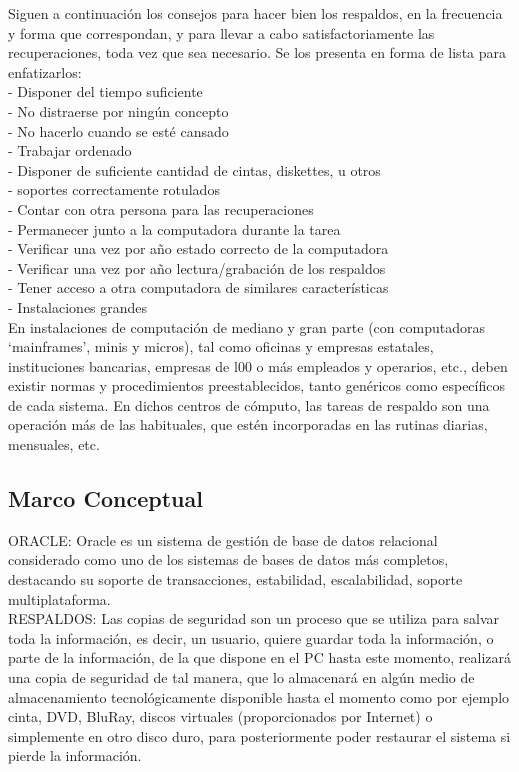 \documentclass[12pt,letterpaper]{article}
\begin{document}
Siguen a continuación los consejos para hacer bien los respaldos, en la frecuencia y forma que correspondan, y para llevar a cabo satisfactoriamente las recuperaciones, toda vez que sea necesario. Se los presenta en forma de lista para enfatizarlos: \\
-	Disponer del tiempo suficiente\\
-	No distraerse por ningún concepto\\
-	No hacerlo cuando se esté cansado\\
-	Trabajar ordenado\\
-	Disponer de suficiente cantidad de cintas, diskettes, u otros \\
-	soportes correctamente rotulados\\
-	Contar con otra persona para las recuperaciones\\
-	Permanecer junto a la computadora durante la  tarea\\
-	Verificar una vez por año estado correcto de la computadora\\
-	Verificar una vez por año lectura/grabación de los respaldos\\
-	Tener acceso a otra computadora de similares características  \\

- 	Instalaciones grandes\\
 En instalaciones de computación de mediano y gran parte (con computadoras ‘mainframes’, minis y micros), tal como oficinas y empresas estatales, instituciones bancarias, empresas de l00 o más empleados y operarios, etc., deben existir normas y procedimientos preestablecidos, tanto genéricos como específicos de cada sistema. En dichos centros de cómputo, las tareas de respaldo son una operación más de las habituales, que estén incorporadas en las rutinas diarias, mensuales, etc.\\




\subsection{Marco Conceptual}

 ORACLE: Oracle es un sistema de gestión de base de datos relacional considerado como uno de los sistemas de bases de datos más completos, destacando su soporte de transacciones, estabilidad, escalabilidad, soporte multiplataforma. \\

 RESPALDOS: Las copias de seguridad son un proceso que se utiliza para salvar toda la información, es decir, un usuario, quiere guardar toda la información, o parte de la información, de la que dispone en el PC hasta este momento, realizará una copia de seguridad de tal manera, que lo almacenará en algún medio de almacenamiento tecnológicamente disponible hasta el momento como por ejemplo cinta, DVD, BluRay, discos virtuales (proporcionados por Internet) o simplemente en otro disco duro, para posteriormente poder restaurar el sistema si pierde la información.\\
\end{document}
